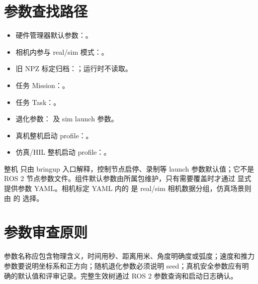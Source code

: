 \section{参数查找路径}
\begin{itemize}
  \item 硬件管理器默认参数：。
  \item 相机内参与 real/sim 模式：。
  \item 旧 NPZ 标定归档：；运行时不读取。
  \item 任务 Mission：。
  \item 任务 Task：。
  \item 退化参数： 及 sim launch 参数。
  \item 真机整机启动 profile：。
  \item 仿真/HIL 整机启动 profile：。
\end{itemize}

整机  只由 bringup 入口解释，控制节点启停、录制等 launch 参数默认值；它不是 ROS 2 节点参数文件。组件默认参数由所属包维护，只有需要覆盖时才通过  显式提供参数 YAML。相机标定 YAML 内的  是 real/sim 相机数据分组，仿真场景则由  的  选择。

\section{参数审查原则}
参数名称应包含物理含义，时间用秒、距离用米、角度明确度或弧度；速度和推力参数要说明坐标系和正方向；随机退化参数必须说明 seed；真机安全参数应有明确的默认值和评审记录。完整生效树通过 ROS 2 参数查询和启动日志确认。
